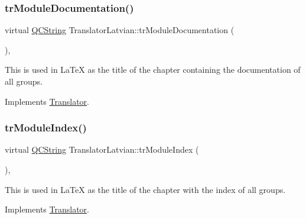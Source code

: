 \mbox{\label{class_translator_latvian_ae783a0abe511b715d27b865a15a06f22}} 
\subsubsection{\texorpdfstring{trModuleDocumentation()}{trModuleDocumentation()}}
{\footnotesize\ttfamily virtual \mbox{\hyperlink{class_q_c_string}{Q\+C\+String}} Translator\+Latvian\+::tr\+Module\+Documentation (\begin{DoxyParamCaption}{ }\end{DoxyParamCaption})\hspace{0.3cm}{\ttfamily [inline]}, {\ttfamily [virtual]}}

This is used in La\+TeX as the title of the chapter containing the documentation of all groups. 

Implements \mbox{\hyperlink{class_translator}{Translator}}.

\mbox{\label{class_translator_latvian_adcee44d3b829f29f8ae12e49545953fa}} 
\subsubsection{\texorpdfstring{trModuleIndex()}{trModuleIndex()}}
{\footnotesize\ttfamily virtual \mbox{\hyperlink{class_q_c_string}{Q\+C\+String}} Translator\+Latvian\+::tr\+Module\+Index (\begin{DoxyParamCaption}{ }\end{DoxyParamCaption})\hspace{0.3cm}{\ttfamily [inline]}, {\ttfamily [virtual]}}

This is used in La\+TeX as the title of the chapter with the index of all groups. 

Implements \mbox{\hyperlink{class_translator}{Translator}}.

\mbox{\label{class_translator_latvian_a38bdd2e29aa00cd0c4384c893a9da162}} 
